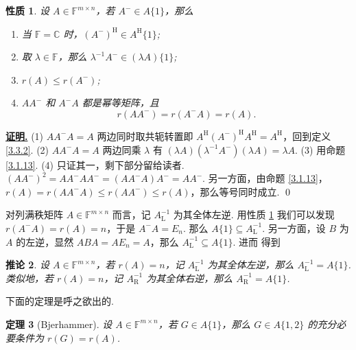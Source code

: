 \documentclass[10pt,openany]{article}
\theoremstyle{thmstyle} %
\newtheorem{theorem}{定理}[subsection]
\theoremstyle{defstyle} %
\newtheorem{corollary}[theorem]{推论}
\theoremstyle{prostyle} %
\newtheorem{property}[theorem]{性质}
\theoremstyle{exastyle}
\theoremstyle{remstyle}
\renewenvironment{proof}[1][证明]{\par\underline{\textbf{#1.}} \;\fangsong}{\qed\par}
\newcommand{\Her}{^{\text{H}}}
\newcommand{\F}{\mathbb{F}}
\newcommand{\C}{\mathbb{C}}
\newcommand{\mn}{^{m \times n}}
\begin{document}
\begin{property} \label{3.3.7}
	设 \( A \in \F\mn \)，若 \( A^{-} \in A\{1\} \)，那么
	\begin{enumerate}[(1)]
		\item 当 \( \F=\C \) 时，\( (A^{-})\Her \in A\Her \{1\} \);
		\item 取 \( \lambda \in \F \)，那么 \( \lambda^{-1} A^{-} \in (\lambda A)\{1\}\);
		\item \( r(A) \leq r(A^{-}) \);
		\item \( AA^{-} \) 和 \( A^{-}A \) 都是幂等矩阵，且
		\[ r(AA^{-})=r(A^{-}A)=r(A). \]
	\end{enumerate}
\end{property}

\begin{proof}
	(1) \( AA^{-}A=A \) 两边同时取共轭转置即 \( A\Her (A^{-})\Her A\Her=A\Her \)，回到定义 \ref{3.3.2}. (2) \( AA^{-}A=A \) 两边同乘 \( \lambda \) 有 \( (\lambda A) (\lambda^{-1} A^{-}) (\lambda A)= \lambda A \). (3) 用命题 \ref{3.1.13}. (4) 只证其一，剩下部分留给读者. \( (AA^{-})^2=AA^{-}AA^{-}=(AA^{-}A)A^{-}=AA^{-} \). 另一方面，由命题 \ref{3.1.13}，\( r(A)=r(AA^{-}A) \leq r(AA^{-}) \leq r(A) \)，那么等号同时成立.
\end{proof}

对列满秩矩阵 \( A \in \F\mn \) 而言，记 \( A_{\text{L}}^{-1} \) 为其全体左逆. 用性质 \ref{3.3.7} 我们可以发现 \( r(A^{-}A)=r(A)=n \)，于是 \( A^{-}A=E_n \). 那么 \( A\{1\} \subseteq A_{\text{L}}^{-1}  \). 另一方面，设 \( B \) 为 \( A \) 的左逆，显然 \( ABA=AE_n=A \)，那么 \( A_{\text{L}}^{-1} \subseteq  A\{1\} \). 进而
得到

\begin{corollary} \label{3.3.8}
	设 \( A \in \F\mn \)，若 \( r(A)=n \)，记  \( A_{\text{L}}^{-1} \) 为其全体左逆，那么 \( A_{\text{L}}^{-1} =  A\{1\} \). 类似地，若 \( r(A)=n \)，记  \( A_{\text{R}}^{-1} \) 为其全体右逆，那么 \( A_{\text{R}}^{-1} =  A\{1\} \).
\end{corollary}

下面的定理是呼之欲出的.

\begin{theorem}[Bjerhammer] \label{3.3.9}
	设 \( A \in \F\mn \)，若 \( G \in A\{1\} \)，那么 \( G \in A\{1,2\} \) 的充分必要条件为 \( r(G)=r(A) \).
\end{theorem}
\end{document}
